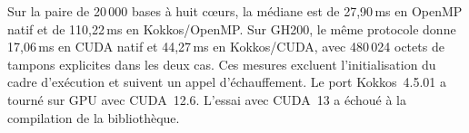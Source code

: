 Sur la paire de 20\,000 bases à huit cœurs, la médiane est de 27,90\,ms en OpenMP natif et de 110,22\,ms en Kokkos/OpenMP. Sur GH200, le même protocole donne 17,06\,ms en CUDA natif et 44,27\,ms en Kokkos/CUDA, avec 480\,024 octets de tampons explicites dans les deux cas. Ces mesures excluent l'initialisation du cadre d'exécution et suivent un appel d'échauffement. Le port Kokkos~4.5.01 a tourné sur GPU avec CUDA~12.6. L'essai avec CUDA~13 a échoué à la compilation de la bibliothèque.

